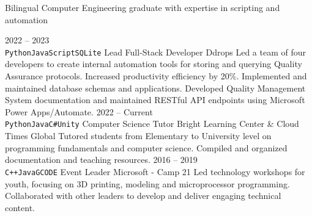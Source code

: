 \documentclass[9pt]{src/developercv} %
\begin{document}


\begin{minipage}[t]{0.4\textwidth} %
	\vspace{-\baselineskip} %
	
	Bilingual Computer Engineering graduate with expertise in scripting and automation\\ %
\end{minipage}
\hfill %
\begin{minipage}[t]{0.5\textwidth} %
	\vspace{-\baselineskip} %
	
\end{minipage}



\begin{entrylist}
	\entry
		{2022 -- 2023\\\footnotesize{\texttt{Python}\slashsep\texttt{JavaScript}\slashsep\texttt{SQLite}}}
		{Lead Full-Stack Developer}
		{Ddrops}
		{Led a team of four developers to create internal automation tools for storing and querying Quality Assurance protocols. Increased productivity efficiency by 20\%. Implemented and maintained database schemas and applications. Developed Quality Management System documentation and maintained RESTful API endpoints using Microsoft Power Apps/Automate.}
	\entry
		{2022 -- Current\\\footnotesize{\texttt{Python}\slashsep\texttt{Java}\slashsep\texttt{C\#}\slashsep\texttt{Unity}}}
		{Computer Science Tutor}
		{Bright Learning Center \& Cloud Times Global}
		{Tutored students from Elementary to University level on programming fundamentals and computer science. Compiled and organized documentation and teaching resources.}
	\entry
		{2016 -- 2019\\\footnotesize{\texttt{C++}\slashsep\texttt{Java}\slashsep\texttt{GCODE}}}
		{Event Leader}
		{Microsoft - Camp 21}
		{Led technology workshops for youth, focusing on 3D printing, modeling and microprocessor programming. Collaborated with other leaders to develop and deliver engaging technical content.}
\end{entrylist}
\end{document}
